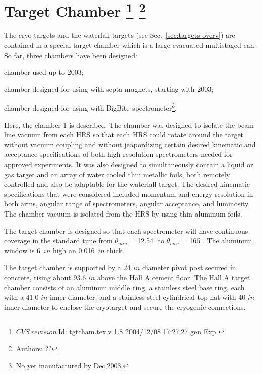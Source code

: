\chapter[Target Chamber]{Target Chamber
\footnote{
  $CVS~revision~ $Id: tgtcham.tex,v 1.8 2004/12/08 17:27:27 gen Exp $ $
}
\footnote{Authors: ?? }
}
\label{sec:target_chamb}

The cryo-targets and the waterfall targets 
(see Sec.~\ref{sec:targets-overv}) 
are contained in a special target chamber which is a large 
evacuated  multistaged can. So far, three chambers have been designed:
\begin{list}{.~}{\setlength{\itemsep}{-0.15cm}}
  \item chamber used up to 2003;
  \item chamber designed for using with septa magnets, starting with 2003;
  \item chamber designed for using with BigBite spectrometer\footnote{
        No yet manufactured by Dec,2003.}.
\end{list}

Here, the chamber 1 is described.
The chamber was designed to isolate the beam line vacuum from  each
HRS so that each HRS could rotate
around the target without vacuum coupling and without jeapordizing
certain desired kinematic and acceptance  specifications of 
both high resolution spectrometers
needed for approved experiments.  It  was also designed to simultaneously
 contain a liquid or gas target and an array of water cooled thin
 metallic foils, both remotely controlled and also be adaptable for
the waterfall target. The desired kinematic specifications that were
 considered included momentum and energy resolution in both arms,
 angular range of spectrometers, angular acceptance, and luminosity.
The chamber vacuum is isolated from the  HRS by using thin aluminum foils. 

The target chamber is designed so that
each spectrometer will have continuous coverage in the standard tune from
$\theta_{min}=$12.54$^\circ$ to $\theta_{max}=$165$^\circ$.
The aluminum window is 6~$in$ high an 0.016~$in$ thick.

The target chamber is supported by a 24 $in$ diameter pivot post
secured in concrete, rising about 93.6 $in$ above the Hall A cement floor.
The Hall A target chamber
consists of an aluminum middle ring, a stainless steel base ring,
each with a 41.0 $in$ inner diameter,
and a stainless steel cylindrical top hat with 40 $in$ inner diameter
to enclose the cryotarget and secure the cryogenic connections.

